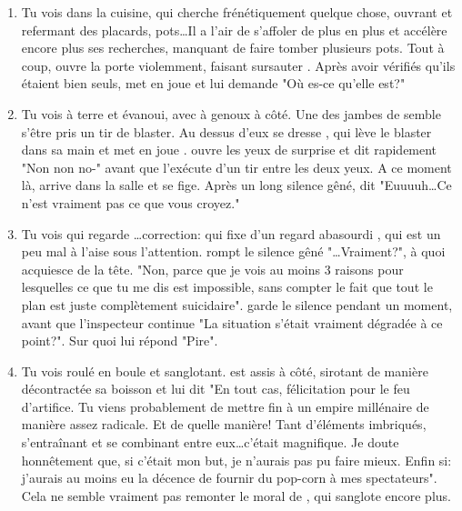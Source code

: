 {	\begin{enumerate}
		\item Tu vois \nmPlayerII dans la cuisine, qui cherche frénétiquement quelque chose, ouvrant et refermant des placards, pots\dots Il a l'air de s'affoler de plus en plus et accélère encore plus ses recherches, manquant de faire tomber plusieurs pots. Tout à coup, \nmPlayerVIII ouvre la porte violemment, faisant sursauter \nmPlayerII. Après avoir vérifiés qu'ils étaient bien seuls, \nmPlayerVIII met en joue \nmPlayerII et lui demande "Où es-ce qu'elle est?"
		
		\item Tu vois \nmPlayerII à terre et évanoui, avec \nmPlayerI à genoux à côté. Une des jambes de \nmPlayerI semble s'être pris un tir de blaster. Au dessus d'eux se dresse \nmPlayerXI, qui lève le blaster dans sa main et met en joue \nmPlayerI. \nmPlayerI ouvre les yeux de surprise et dit rapidement "Non non no-" avant que \nmPlayerXI l'exécute d'un tir entre les deux yeux. A ce moment là, \nmPlayerVII arrive dans la salle et \nmPlayerXI se fige. Après un long silence gêné, \nmPlayerVII dit "Euuuuh\dots Ce n'est vraiment pas ce que vous croyez."
		
		\item Tu vois \nmPlayerVII qui regarde \nmPlayerV\dots correction: qui fixe d'un regard abasourdi \nmPlayerV, qui est un peu mal à l'aise sous l'attention. \nmPlayerVII rompt le silence gêné "\dots Vraiment?", à quoi \nmPlayerV acquiesce de la tête. "Non, parce que je vois au moins 3 raisons pour lesquelles ce que tu me dis est impossible, sans compter le fait que tout le plan est juste complètement suicidaire". \nmPlayerV garde le silence pendant un moment, avant que l'inspecteur continue "La situation s'était vraiment dégradée à ce point?". Sur quoi \nmPlayerV lui répond "Pire".
		
		\item Tu vois \nmPlayerXI roulé en boule et sanglotant. \nmPlayerIV est assis à côté, sirotant de manière décontractée sa boisson et lui dit "En tout cas, félicitation pour le feu d'artifice. Tu viens probablement de mettre fin à un empire millénaire de manière assez radicale. Et de quelle manière! Tant d'éléments imbriqués, s'entraînant et se combinant entre eux\dots c'était magnifique. Je doute honnêtement que, si c'était mon but, je n'aurais pas pu faire mieux. Enfin si: j'aurais au moins eu la décence de fournir du pop-corn à mes spectateurs". Cela ne semble vraiment pas remonter le moral de \nmPlayerXI, qui sanglote encore plus.
		

\end{enumerate}}
